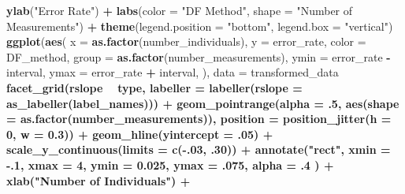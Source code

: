 \documentclass[12pt, twoside]{amherstthesis}
\newenvironment{Shaded}{\begin{snugshade}}{\end{snugshade}}
\newcommand{\DataTypeTok}[1]{\textcolor[rgb]{0.13,0.29,0.53}{#1}}
\newcommand{\DecValTok}[1]{\textcolor[rgb]{0.00,0.00,0.81}{#1}}
\newcommand{\FloatTok}[1]{\textcolor[rgb]{0.00,0.00,0.81}{#1}}
\newcommand{\KeywordTok}[1]{\textcolor[rgb]{0.13,0.29,0.53}{\textbf{#1}}}
\newcommand{\NormalTok}[1]{#1}
\newcommand{\OperatorTok}[1]{\textcolor[rgb]{0.81,0.36,0.00}{\textbf{#1}}}
\newcommand{\StringTok}[1]{\textcolor[rgb]{0.31,0.60,0.02}{#1}}
\begin{document}
\begin{Shaded}
\begin{Highlighting}[]
{{{{{{{{{{{{\StringTok{  }\KeywordTok{ylab}\NormalTok{(}\StringTok{"Error Rate"}\NormalTok{) }\OperatorTok{+}
\StringTok{  }\KeywordTok{labs}\NormalTok{(}\DataTypeTok{color =} \StringTok{"DF Method"}\NormalTok{, }\DataTypeTok{shape =} \StringTok{"Number of Measurements"}\NormalTok{) }\OperatorTok{+}
\StringTok{  }\KeywordTok{theme}\NormalTok{(}\DataTypeTok{legend.position =} \StringTok{"bottom"}\NormalTok{, }\DataTypeTok{legend.box =} \StringTok{"vertical"}\NormalTok{)}
\KeywordTok{ggplot}\NormalTok{(}\KeywordTok{aes}\NormalTok{(}
  \DataTypeTok{x =} \KeywordTok{as.factor}\NormalTok{(number_individuals), }\DataTypeTok{y =}\NormalTok{ error_rate, }\DataTypeTok{color =}\NormalTok{ DF_method,}
  \DataTypeTok{group =} \KeywordTok{as.factor}\NormalTok{(number_measurements), }\DataTypeTok{ymin =}\NormalTok{ error_rate }\OperatorTok{-}\StringTok{ }\NormalTok{interval, }
  \DataTypeTok{ymax =}\NormalTok{ error_rate }\OperatorTok{+}\StringTok{ }\NormalTok{interval,}
\NormalTok{), }\DataTypeTok{data =}\NormalTok{ transformed_data }\OperatorTok{%>%}\StringTok{ }\KeywordTok{filter}\NormalTok{(distribution }\OperatorTok{==}\StringTok{ "Gaussian"}\NormalTok{)) }\OperatorTok{+}
\StringTok{  }\KeywordTok{facet_grid}\NormalTok{(rslope }\OperatorTok{~}\StringTok{ }\NormalTok{type,}
             \DataTypeTok{labeller =} \KeywordTok{labeller}\NormalTok{(}\DataTypeTok{rslope =} \KeywordTok{as_labeller}\NormalTok{(label_names))) }\OperatorTok{+}
\StringTok{  }\KeywordTok{geom_pointrange}\NormalTok{(}\DataTypeTok{alpha =} \FloatTok{.5}\NormalTok{, }\KeywordTok{aes}\NormalTok{(}\DataTypeTok{shape =} \KeywordTok{as.factor}\NormalTok{(number_measurements)), }
                  \DataTypeTok{position =} \KeywordTok{position_jitter}\NormalTok{(}\DataTypeTok{h =} \DecValTok{0}\NormalTok{, }\DataTypeTok{w =} \FloatTok{0.3}\NormalTok{)) }\OperatorTok{+}
\StringTok{  }\KeywordTok{geom_hline}\NormalTok{(}\DataTypeTok{yintercept =} \FloatTok{.05}\NormalTok{) }\OperatorTok{+}
\StringTok{  }\KeywordTok{scale_y_continuous}\NormalTok{(}\DataTypeTok{limits =} \KeywordTok{c}\NormalTok{(}\OperatorTok{-}\NormalTok{.}\DecValTok{03}\NormalTok{, }\FloatTok{.30}\NormalTok{)) }\OperatorTok{+}
\StringTok{  }\KeywordTok{annotate}\NormalTok{(}\StringTok{"rect"}\NormalTok{,}
    \DataTypeTok{xmin =} \FloatTok{-.1}\NormalTok{, }\DataTypeTok{xmax =} \DecValTok{4}\NormalTok{, }\DataTypeTok{ymin =} \FloatTok{0.025}\NormalTok{, }\DataTypeTok{ymax =} \FloatTok{.075}\NormalTok{,}
    \DataTypeTok{alpha =} \FloatTok{.4}
\NormalTok{  ) }\OperatorTok{+}
\StringTok{  }\KeywordTok{xlab}\NormalTok{(}\StringTok{"Number of Individuals"}\NormalTok{) }\OperatorTok{+}
}}}}}}}}}}}}}
\end{Highlighting}
\end{Shaded}
\end{document}
